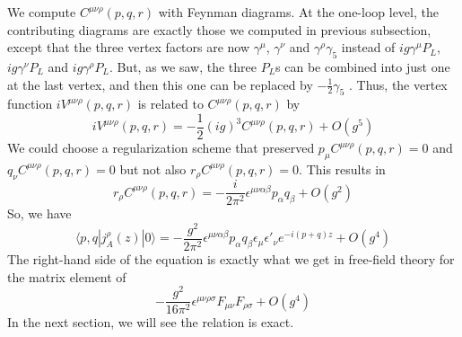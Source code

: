 \documentclass[cyan]{elegantnote}
\begin{document}
We compute $C^{\mu\nu\rho}(p,q,r)$ with Feynman diagrams. At the one-loop level, the contributing diagrams are exactly those we computed in previous subsection, except that the three vertex factors are now $\gamma^{\mu}$, $\gamma^{\nu}$ and $\gamma^{\rho}\gamma_5$ instead of $ig\gamma^{\mu}P_L$, $ig\gamma^{\nu}P_L$ and $ig\gamma^{\rho}P_L$. But, as we saw, the three $P_L$s can be combined into just one at the last vertex, and then this one can be replaced by $-\frac{1}{2}\gamma_5$ . Thus, the vertex function $iV^{\mu\nu\rho}(p,q,r)$ is related to $C^{\mu\nu\rho}(p,q,r)$ by
\[iV^{\mu\nu\rho}(p,q,r) = -\frac{1}{2}(ig)^3 C^{\mu\nu\rho}(p,q,r) + O(g^5)\]
We could choose a regularization scheme that
preserved $p_{\mu}C^{\mu\nu\rho}(p,q,r) = 0$ and $q_{\nu}C^{\mu\nu\rho}(p,q,r) = 0$ but not also $r_{\rho}C^{\mu\nu\rho}(p,q,r) = 0$. This results in
\[r_{\rho}C^{\mu\nu\rho}(p,q,r) = -\frac{i}{2\pi^2} \epsilon^{\mu\nu\alpha\beta} p_{\alpha} q_{\beta} + O(g^2)\]
So, we have
\[\langle p,q | j^{\rho}_A(z) |  0 \rangle  = - \frac{g^2}{2\pi^2} \epsilon^{\mu\nu\alpha\beta} p_{\alpha} q_{\beta} \epsilon_{\mu} \epsilon'_{\nu} e^{-i(p+q)z} + O(g^4) \]
The right-hand side of the equation is exactly what we get in free-field theory for the matrix element of
\[- \frac{g^2}{16\pi^2} \epsilon^{\mu\nu\rho\sigma}F_{\mu\nu}F_{\rho\sigma} + O(g^4) \]
In the next section, we will see the relation is exact.
\end{document}
